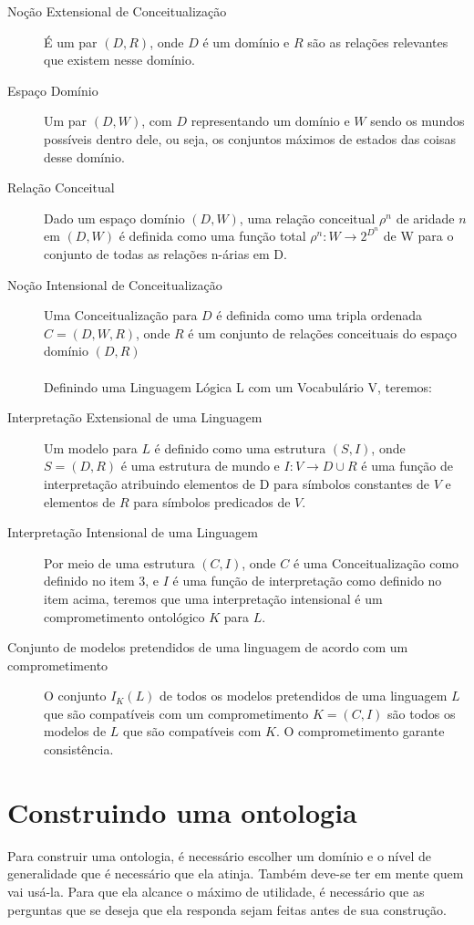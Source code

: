 \begin{description}
	\item[Noção Extensional de Conceitualização] É um par $(D,R)$, onde $D$ é um domínio e $R$ são as relações relevantes que existem nesse domínio.
	\item[Espaço Domínio] Um par $(D,W)$, com $ D $ representando um domínio e $ W $ sendo os mundos possíveis dentro dele, ou seja, os conjuntos máximos de estados das coisas desse domínio.
	\item[Relação Conceitual] Dado um espaço domínio $ (D,W) $, uma relação conceitual $ \rho^n $ de aridade $ n $ em $ (D,W) $ é definida como uma função total $ \rho^n : W \to 2^{D^n}$ de W para o conjunto de todas as relações n-árias em D.
	\item[Noção Intensional de Conceitualização] Uma Conceitualização para $ D $ é definida como uma tripla ordenada $ C=(D,W,R) $, onde $ R $ é um conjunto de relações conceituais do espaço domínio $ (D,R) $ \\ \\
	Definindo uma Linguagem Lógica L com um Vocabulário V, teremos:
	\item[Interpretação Extensional de uma Linguagem] Um modelo para $ L $ é definido como uma estrutura $ (S,I) $, onde $ S=(D,R) $ é uma estrutura de mundo e $ I : V \to D \cup R $ é uma função de interpretação atribuindo elementos de D para símbolos constantes de $ V $ e elementos de $ R $ para símbolos predicados de $ V $.
	\item[Interpretação Intensional de uma Linguagem] Por meio de uma estrutura $ (C, I) $, onde $ C $ é uma Conceitualização como definido no item 3, e $ I $ é uma função de interpretação como definido no item acima, teremos que uma interpretação intensional é um comprometimento ontológico $ K $ para $ L $. 
	\item[Conjunto de modelos pretendidos de uma linguagem de acordo com um comprometimento] O conjunto $ I_K(L) $ de todos os modelos pretendidos de uma linguagem $ L $ que são compatíveis com um comprometimento $ K = (C,I) $ são todos os modelos de $ L $ que são compatíveis com $ K $. O comprometimento garante consistência.
\end{description}

\section{Construindo uma ontologia}

Para construir uma ontologia, é necessário escolher um domínio e o nível de generalidade que é necessário que ela atinja. Também deve-se ter em mente quem vai usá-la. Para que ela alcance o máximo de utilidade, é necessário que as perguntas que se deseja que ela responda sejam feitas antes de sua construção.

